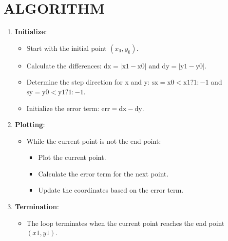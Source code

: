 \documentclass{article}
\begin{document}
\section*{ALGORITHM}
\begin{enumerate}
    \item \textbf{Initialize}:
    \begin{itemize}
        \item Start with the initial point $(x_0, y_0)$.
        \item Calculate the differences: $\text{dx} = |\text{x1} - \text{x0}|$ and $\text{dy} = |\text{y1} - \text{y0}|$.
        \item Determine the step direction for x and y: $\text{sx} = \text{x0} < \text{x1} ? 1 : -1$ and $\text{sy} = \text{y0} < \text{y1} ? 1 : -1$.
        \item Initialize the error term: $\text{err} = \text{dx} - \text{dy}$.
    \end{itemize}
    \item \textbf{Plotting}:
    \begin{itemize}
        \item While the current point is not the end point:
        \begin{itemize}
            \item Plot the current point.
            \item Calculate the error term for the next point.
            \item Update the coordinates based on the error term.
        \end{itemize}
    \end{itemize}
    \item \textbf{Termination}:
    \begin{itemize}
        \item The loop terminates when the current point reaches the end point $(x1, y1)$.
    \end{itemize}
\end{enumerate}
\end{document}
